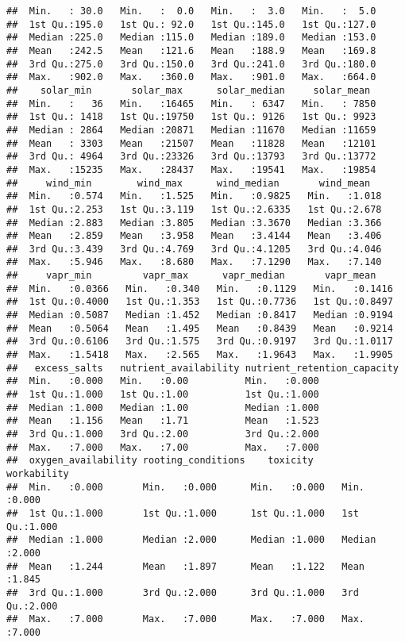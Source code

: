 \documentclass[]{article}
\begin{document}
\begin{verbatim}
##  Min.   : 30.0   Min.   :  0.0   Min.   :  3.0   Min.   :  5.0  
##  1st Qu.:195.0   1st Qu.: 92.0   1st Qu.:145.0   1st Qu.:127.0  
##  Median :225.0   Median :115.0   Median :189.0   Median :153.0  
##  Mean   :242.5   Mean   :121.6   Mean   :188.9   Mean   :169.8  
##  3rd Qu.:275.0   3rd Qu.:150.0   3rd Qu.:241.0   3rd Qu.:180.0  
##  Max.   :902.0   Max.   :360.0   Max.   :901.0   Max.   :664.0  
##    solar_min       solar_max      solar_median     solar_mean   
##  Min.   :   36   Min.   :16465   Min.   : 6347   Min.   : 7850  
##  1st Qu.: 1418   1st Qu.:19750   1st Qu.: 9126   1st Qu.: 9923  
##  Median : 2864   Median :20871   Median :11670   Median :11659  
##  Mean   : 3303   Mean   :21507   Mean   :11828   Mean   :12101  
##  3rd Qu.: 4964   3rd Qu.:23326   3rd Qu.:13793   3rd Qu.:13772  
##  Max.   :15235   Max.   :28437   Max.   :19541   Max.   :19854  
##     wind_min        wind_max      wind_median       wind_mean    
##  Min.   :0.574   Min.   :1.525   Min.   :0.9825   Min.   :1.018  
##  1st Qu.:2.253   1st Qu.:3.119   1st Qu.:2.6335   1st Qu.:2.678  
##  Median :2.883   Median :3.805   Median :3.3670   Median :3.366  
##  Mean   :2.859   Mean   :3.958   Mean   :3.4144   Mean   :3.406  
##  3rd Qu.:3.439   3rd Qu.:4.769   3rd Qu.:4.1205   3rd Qu.:4.046  
##  Max.   :5.946   Max.   :8.680   Max.   :7.1290   Max.   :7.140  
##     vapr_min         vapr_max      vapr_median       vapr_mean     
##  Min.   :0.0366   Min.   :0.340   Min.   :0.1129   Min.   :0.1416  
##  1st Qu.:0.4000   1st Qu.:1.353   1st Qu.:0.7736   1st Qu.:0.8497  
##  Median :0.5087   Median :1.452   Median :0.8417   Median :0.9194  
##  Mean   :0.5064   Mean   :1.495   Mean   :0.8439   Mean   :0.9214  
##  3rd Qu.:0.6106   3rd Qu.:1.575   3rd Qu.:0.9197   3rd Qu.:1.0117  
##  Max.   :1.5418   Max.   :2.565   Max.   :1.9643   Max.   :1.9905  
##   excess_salts   nutrient_availability nutrient_retention_capacity
##  Min.   :0.000   Min.   :0.00          Min.   :0.000              
##  1st Qu.:1.000   1st Qu.:1.00          1st Qu.:1.000              
##  Median :1.000   Median :1.00          Median :1.000              
##  Mean   :1.156   Mean   :1.71          Mean   :1.523              
##  3rd Qu.:1.000   3rd Qu.:2.00          3rd Qu.:2.000              
##  Max.   :7.000   Max.   :7.00          Max.   :7.000              
##  oxygen_availability rooting_conditions    toxicity      workability   
##  Min.   :0.000       Min.   :0.000      Min.   :0.000   Min.   :0.000  
##  1st Qu.:1.000       1st Qu.:1.000      1st Qu.:1.000   1st Qu.:1.000  
##  Median :1.000       Median :2.000      Median :1.000   Median :2.000  
##  Mean   :1.244       Mean   :1.897      Mean   :1.122   Mean   :1.845  
##  3rd Qu.:1.000       3rd Qu.:2.000      3rd Qu.:1.000   3rd Qu.:2.000  
##  Max.   :7.000       Max.   :7.000      Max.   :7.000   Max.   :7.000
\end{verbatim}
\end{document}
